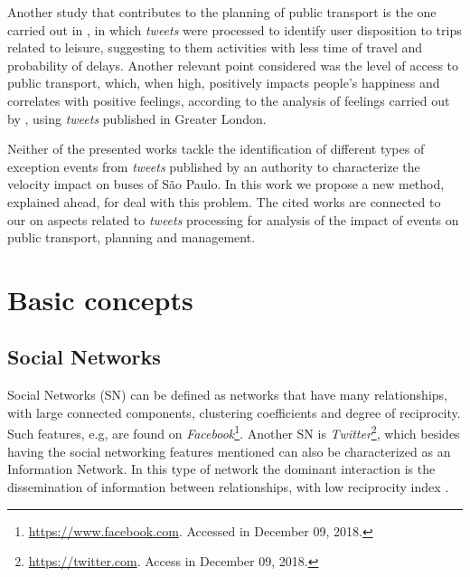 \documentclass[runningheads]{llncs}
\begin{document}
Another study that contributes to the planning of public transport is the one carried out in \cite {Gkiotsalitis2015, Gkiotsalitis2016}, in which \textit{tweets} were processed to identify user disposition to trips related to leisure, suggesting to them activities with less time of travel and probability of delays. Another relevant point considered was the level of access to public transport, which, when high, positively impacts people's happiness and correlates with positive feelings, according to the analysis of feelings carried out by \cite{Guo2016}, using \textit{tweets} published in Greater London.

Neither of the presented works tackle the identification of different types of exception events from \textit{tweets} published by an authority to characterize the velocity impact on buses of São Paulo. In this work we propose a new method, explained ahead, for deal with this problem.
The cited works are connected to our on aspects related to \textit{tweets} processing for analysis of the impact of events on public transport, planning and management.

\section{Basic concepts}

\subsection{Social Networks}
\label{sns}

Social Networks (SN) can be defined as networks that have many relationships, with large connected components, clustering coefficients and degree of reciprocity. Such features, e.g, are found on \textit{Facebook}\footnote{\url{https://www.facebook.com}. Accessed in December 09, 2018.}. Another SN is  \textit {Twitter}\footnote{\url{https://twitter.com}. Access in December 09, 2018.}, which besides having the social networking features mentioned can also be characterized as an Information Network. In this type of network the dominant interaction is the dissemination of information between relationships, with low reciprocity index \cite{myers2014information}.
\end{document}
